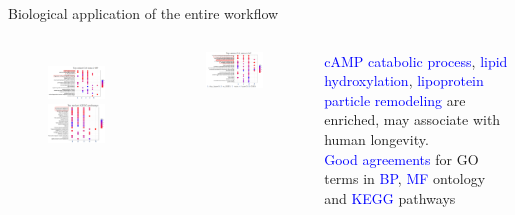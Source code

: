 \documentclass[10pt]{beamer}
\begin{document}
\begin{frame}{Biological application of the entire workflow}
\vspace{-0.5cm}
\begin{columns}
    \begin{figure}
        \includegraphics[width=6.3cm]{demo/images/top_go_bp.png}\\
        \vspace{0.2cm}
        \includegraphics[width=5.2cm]{demo/images/top_kegg.png}
    \end{figure}
    \vspace{-0.5cm}
    \begin{figure}
        \includegraphics[width=6.3cm]{demo/images/top_go_mf.png}
    \end{figure}
    \small
    \textcolor{blue}{cAMP catabolic process}, \textcolor{blue}{lipid hydroxylation}, \textcolor{blue}{lipoprotein particle remodeling} are enriched, may associate with human longevity. \\
    \addlinespace
    \textcolor{blue}{Good agreements} for GO terms in \textcolor{blue}{BP}, \textcolor{blue}{MF} ontology and \textcolor{blue}{KEGG} pathways
\end{columns}
\end{frame}
\end{document}
